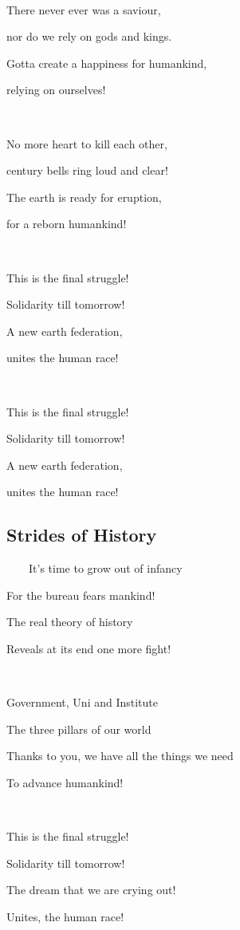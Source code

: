 \documentclass[11pt]{article}
\begin{document}
	\ 
	
	There never ever was a saviour,

	nor do we rely on gods and kings.

	Gotta create a happiness for humankind,

	relying on ourselves!

    \ 
    
    No more heart to kill each other,
    
    century bells ring loud and clear!
    
    The earth is ready for eruption,
    
    for a reborn humankind!
    
    \ 
    
    This is the final struggle! 
    
    Solidarity till tomorrow!
    
    A new earth federation,
    
    unites the human race! 
    
    \ 
    
    This is the final struggle!
    
    Solidarity till tomorrow!
    
    A new earth federation,
    
    unites the human race!
	\newpage
	
	\subsection{Strides of History}
	
	\ \ \ \ It's time to grow out of infancy
	
	For the bureau fears mankind!

	The real theory of history

	Reveals at its end one more fight!	
	
	\ 
	
	Government, Uni and Institute
	
	The three pillars of our world
	
	Thanks to you, we have all the things we need
	
	To advance humankind!
	
	\ 
	
	This is the final struggle!
	
	Solidarity till tomorrow!
	
	The dream that we are crying out!
	
	Unites, the human race! 
	
\end{document}
